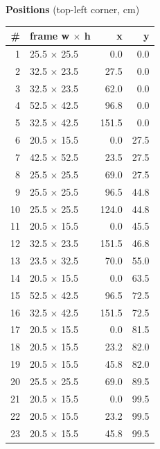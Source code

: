 \documentclass[a4paper,landscape,10pt]{article}
\begin{document}
\begin{minipage}[t]{0.25\textwidth}
\vspace{8pt}
{\bfseries Positions} (top-left corner, cm)\\[2pt]
\tiny
\begin{tabular}{@{}r l r r@{}}
\toprule
\# & frame w $\times$ h & x & y \\
\midrule
1 & 25.5 $\times$ 25.5 & 0.0 & 0.0 \\
2 & 32.5 $\times$ 23.5 & 27.5 & 0.0 \\
3 & 32.5 $\times$ 23.5 & 62.0 & 0.0 \\
4 & 52.5 $\times$ 42.5 & 96.8 & 0.0 \\
5 & 32.5 $\times$ 42.5 & 151.5 & 0.0 \\
6 & 20.5 $\times$ 15.5 & 0.0 & 27.5 \\
7 & 42.5 $\times$ 52.5 & 23.5 & 27.5 \\
8 & 25.5 $\times$ 25.5 & 69.0 & 27.5 \\
9 & 25.5 $\times$ 25.5 & 96.5 & 44.8 \\
10 & 25.5 $\times$ 25.5 & 124.0 & 44.8 \\
11 & 20.5 $\times$ 15.5 & 0.0 & 45.5 \\
12 & 32.5 $\times$ 23.5 & 151.5 & 46.8 \\
13 & 23.5 $\times$ 32.5 & 70.0 & 55.0 \\
14 & 20.5 $\times$ 15.5 & 0.0 & 63.5 \\
15 & 52.5 $\times$ 42.5 & 96.5 & 72.5 \\
16 & 32.5 $\times$ 42.5 & 151.5 & 72.5 \\
17 & 20.5 $\times$ 15.5 & 0.0 & 81.5 \\
18 & 20.5 $\times$ 15.5 & 23.2 & 82.0 \\
19 & 20.5 $\times$ 15.5 & 45.8 & 82.0 \\
20 & 25.5 $\times$ 25.5 & 69.0 & 89.5 \\
21 & 20.5 $\times$ 15.5 & 0.0 & 99.5 \\
22 & 20.5 $\times$ 15.5 & 23.2 & 99.5 \\
23 & 20.5 $\times$ 15.5 & 45.8 & 99.5 \\
\bottomrule
\end{tabular}
\end{minipage}
\clearpage
\end{document}
